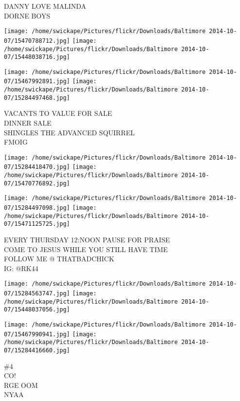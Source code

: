 \documentclass[10pt,letterpaper]{article}
\begin{document}
DANNY LOVE MALINDA\\
DORNE BOYS\\
\pagebreak

\texttt{[image: /home/swickape/Pictures/flickr/Downloads/Baltimore 2014-10-07/15470788712.jpg]}
\texttt{[image: /home/swickape/Pictures/flickr/Downloads/Baltimore 2014-10-07/15448038716.jpg]}

\texttt{[image: /home/swickape/Pictures/flickr/Downloads/Baltimore 2014-10-07/15467992891.jpg]}
\texttt{[image: /home/swickape/Pictures/flickr/Downloads/Baltimore 2014-10-07/15284497468.jpg]}

VACANTS TO VALUE FOR SALE\\
DINNER SALE\\
SHINGLES THE ADVANCED SQUIRREL\\
FMOIG\\
\pagebreak

\texttt{[image: /home/swickape/Pictures/flickr/Downloads/Baltimore 2014-10-07/15284418470.jpg]}
\texttt{[image: /home/swickape/Pictures/flickr/Downloads/Baltimore 2014-10-07/15470776892.jpg]}

\texttt{[image: /home/swickape/Pictures/flickr/Downloads/Baltimore 2014-10-07/15284497098.jpg]}
\texttt{[image: /home/swickape/Pictures/flickr/Downloads/Baltimore 2014-10-07/15471125725.jpg]}

EVERY THURSDAY 12:NOON PAUSE FOR PRAISE\\
COME TO JESUS WHILE YOU STILL HAVE TIME\\
FOLLOW ME @ THATBADCHICK\\
IG: @RK44\\
\pagebreak

\texttt{[image: /home/swickape/Pictures/flickr/Downloads/Baltimore 2014-10-07/15284563747.jpg]}
\texttt{[image: /home/swickape/Pictures/flickr/Downloads/Baltimore 2014-10-07/15448037056.jpg]}

\texttt{[image: /home/swickape/Pictures/flickr/Downloads/Baltimore 2014-10-07/15467990941.jpg]}
\texttt{[image: /home/swickape/Pictures/flickr/Downloads/Baltimore 2014-10-07/15284416660.jpg]}

\#4\\
CO!\\
RGE OOM\\
NYAA\\
\pagebreak
\end{document}

